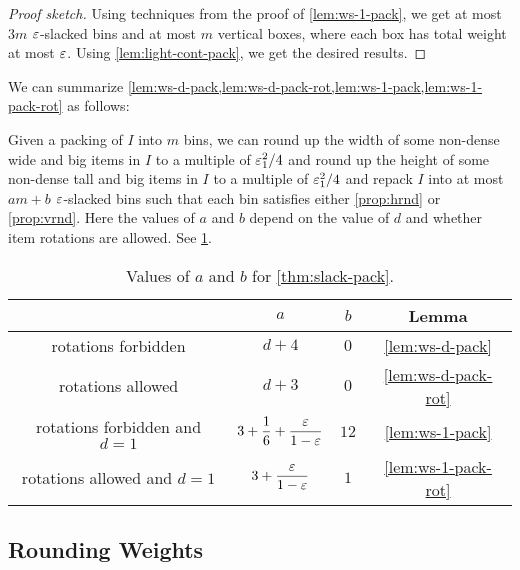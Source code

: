 \begin{proof}[Proof sketch]
Using techniques from the proof of \cref{lem:ws-1-pack},
we get at most $3m$ $\varepsilon$-slacked bins and at most $m$ vertical boxes,
where each box has total weight at most $\varepsilon$.
Using \cref{lem:light-cont-pack}, we get the desired results.
\end{proof}

We can summarize \cref{lem:ws-d-pack,lem:ws-d-pack-rot,lem:ws-1-pack,lem:ws-1-pack-rot} as follows:
\begin{theorem}
\label{thm:slack-pack}
Given a packing of $I$ into $m$ bins, we can
round up the width of some non-dense wide and big items in $I$ to a multiple of $\varepsilon_1^2/4$
and round up the height of some non-dense tall and big items in $I$ to a multiple of $\varepsilon_1^2/4$
and repack $I$ into at most $am + b$ $\varepsilon$-slacked bins such that
each bin satisfies either \cref{prop:hrnd} or \cref{prop:vrnd}.
Here the values of $a$ and $b$ depend on the value of $d$ and whether item rotations are allowed.
See \cref{table:slack-pack-ab}.
\begin{table}[H]
\centering
\caption{Values of $a$ and $b$ for \cref{thm:slack-pack}.}
\begin{tabular}{|c|c|c|c|}
\hline & $a$ & $b$ & Lemma
\\ \hline rotations forbidden
    & $d+4$
    & $0$
    & \cref{lem:ws-d-pack}
\\ \hline rotations allowed
    & $d+3$
    & $0$
    & \cref{lem:ws-d-pack-rot}
\\ \hline rotations forbidden and $d=1$
    & ${\displaystyle 3 + \frac{1}{6} + \frac{\varepsilon}{1-\varepsilon}}$
    & $12$
    & \cref{lem:ws-1-pack}
\\ \hline rotations allowed and $d=1$
    & ${\displaystyle 3 + \frac{\varepsilon}{1-\varepsilon}}$
    & $1$
    & \cref{lem:ws-1-pack-rot}
\\ \hline
\end{tabular}
\label{table:slack-pack-ab}
\end{table}
\end{theorem}

\subsection{Rounding Weights}
\label{sec:gv-rbbp:round-weights}

